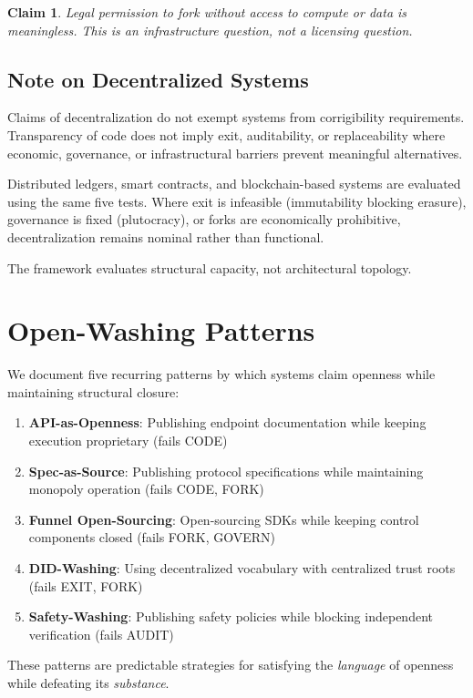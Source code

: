 \documentclass[11pt,a4paper]{article}
\newtheorem{claim}{Claim}
\begin{document}
\begin{claim}
Legal permission to fork without access to compute or data is meaningless. This is an infrastructure question, not a licensing question.
\end{claim}

\subsection{Note on Decentralized Systems}

Claims of decentralization do not exempt systems from corrigibility requirements. Transparency of code does not imply exit, auditability, or replaceability where economic, governance, or infrastructural barriers prevent meaningful alternatives.

Distributed ledgers, smart contracts, and blockchain-based systems are evaluated using the same five tests. Where exit is infeasible (immutability blocking erasure), governance is fixed (plutocracy), or forks are economically prohibitive, decentralization remains nominal rather than functional.

The framework evaluates structural capacity, not architectural topology.

\section{Open-Washing Patterns}

We document five recurring patterns by which systems claim openness while maintaining structural closure:

\begin{enumerate}
    \item \textbf{API-as-Openness}: Publishing endpoint documentation while keeping execution proprietary (fails CODE)
    \item \textbf{Spec-as-Source}: Publishing protocol specifications while maintaining monopoly operation (fails CODE, FORK)
    \item \textbf{Funnel Open-Sourcing}: Open-sourcing SDKs while keeping control components closed (fails FORK, GOVERN)
    \item \textbf{DID-Washing}: Using decentralized vocabulary with centralized trust roots (fails EXIT, FORK)
    \item \textbf{Safety-Washing}: Publishing safety policies while blocking independent verification (fails AUDIT)
\end{enumerate}

These patterns are predictable strategies for satisfying the \textit{language} of openness while defeating its \textit{substance}.
\end{document}
